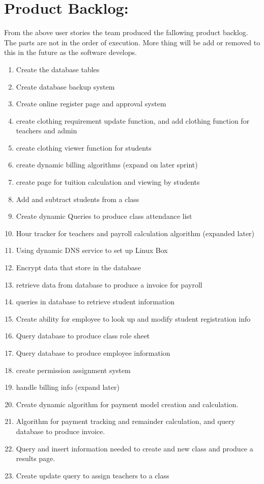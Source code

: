 \documentclass[11pt]{book}
\begin{document}
\section{Product Backlog:}

From the above user stories the team produced the fallowing product backlog. The parts are not in the order of execution. More thing will be add or removed to this in the future as the software develops.

\begin{enumerate}
\item Create the database tables
\item Create database backup system
\item Create online register page and approval system
\item create clothing requirement update function, and add clothing function for teachers and admin
\item create clothing viewer function for students
\item create dynamic billing algorithms (expand on later sprint)
\item create page for tuition calculation and viewing by students
\item Add and subtract students from a class
\item Create dynamic Queries to produce class attendance list
\item Hour tracker for teachers and payroll calculation algorithm (expanded later)
\item Using dynamic DNS service to set up Linux Box
\item Encrypt data that store in the database
\item retrieve data from database to produce a invoice for payroll
\item queries in database to retrieve student information
\item Create ability for employee to look up and modify student registration info
\item Query database to produce class role sheet
\item Query database to produce employee information
\item create permission assignment system
\item handle billing info (expand later)
\item Create dynamic algorithm for payment model creation and calculation. 
\item Algorithm for payment tracking and remainder calculation, and query database to produce invoice.
\item Query and insert information needed to create and new class and produce a results page.
\item Create update query to assign teachers to a class
\end{enumerate}
\end{document}
